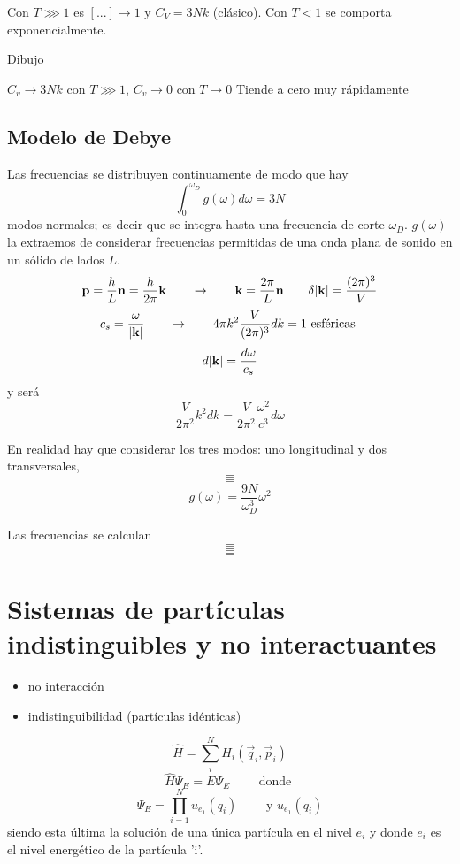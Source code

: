 \documentclass[10pt,oneside]{CBFT_book}
\begin{document}
Con $ T \ggg 1 $ es $ [ ... ] \to 1$ y $C_V = 3Nk $ (clásico). Con $ T < 1 $ se comporta exponencialmente.

Dibujo 

$ C_v \to 3Nk $  con $ T \ggg 1 $, $ C_v \to 0 $ con $ T \to 0 $ Tiende a cero muy rápidamente

\subsection{Modelo de Debye}

Las frecuencias se distribuyen continuamente de modo que hay 
\[
	\int_0^{\omega_D} g(\omega) d\omega = 3N
\]
modos normales; es decir que se integra hasta una frecuencia de corte $\omega_D$. $g(\omega)$ la extraemos de 
considerar frecuencias permitidas de una onda plana de sonido en un sólido de lados $L$.
\[
	\vb{p} = \frac{h}{L}\vb{n} = \frac{h}{2\pi}\vb{k} \qquad \rightarrow  \qquad \vb{k} = \frac{2\pi}{L}\vb{n}
	\qquad \delta |\vb{k}| = \frac{(2\pi)^3}{V}
\]
\[
	c_s = \frac{\omega}{|\vb{k}|} \qquad \rightarrow \qquad  4 \pi k^2 \frac{V}{(2\pi)^3} dk = 1 \text{ esféricas }
\]
\[
	d|\vb{k}| = \frac{d\omega}{c_s}
\]
y será 
\[
	\frac{V}{2\pi^2} k^2 dk = \frac{V}{2\pi^2} \frac{\omega^2}{c^3} d\omega
\]

En realidad hay que considerar los tres modos: uno longitudinal y dos transversales,
\[
	=
\]
\[
	=
\]
\[
	g(\omega) = \frac{9N}{\omega_D^3} \omega^2
\]

Las frecuencias se calculan
\[
	=
\]
\[
	=
\]
\[
	=
\]


\section{Sistemas de partículas indistinguibles y no interactuantes}

\begin{itemize}
 \item no interacción
 \item indistinguibilidad (partículas idénticas)
\end{itemize}

\[
	\hat{H} = \sum_i^N H_i (\vec{q}_i , \vec{p}_i )
\]
\[
	\hat{H} \Psi_E = E \Psi_E \qquad \text{ donde }
\]
\[
	\Psi_E = \prod_{i=1}^{N} u_{e_1}(q_i) \qquad \text{ y } u_{e_1}(q_i)
\]
siendo esta última la solución de una única partícula en el nivel $e_i$ 
y donde $e_i$ es el nivel energético de la partícula 'i'.
\end{document}
